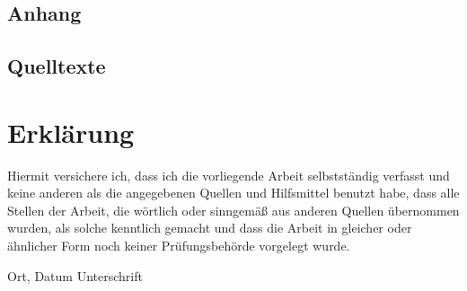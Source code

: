 \begin{landscape}\begin{multicols}{2}
\appendix
\chapter{Anhang}
\section{Quelltexte}
\end{multicols}\end{landscape}






\chapter*{Erklärung}

Hiermit versichere ich, dass ich die vorliegende Arbeit selbstständig verfasst und keine anderen als die angegebenen Quellen und Hilfsmittel benutzt habe, dass alle Stellen der Arbeit, die wörtlich oder sinngemäß aus anderen Quellen übernommen wurden, als solche kenntlich gemacht und dass die Arbeit in gleicher oder ähnlicher Form noch keiner Prüfungsbehörde vorgelegt wurde.

\vspace{3cm}
Ort, Datum \hspace{5cm} Unterschrift\\

